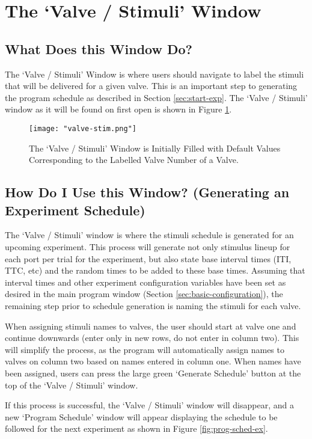 \documentclass{article}
\begin{document}
\clearpage
\section{The `Valve / Stimuli' Window}
\label{sec:valve-stim-window}
\subsection{What Does this Window Do?}
The `Valve / Stimuli' Window is where users should navigate to label the stimuli that will be delivered for a given valve. This is an important step to generating the program 
schedule as described in Section \ref{sec:start-exp}. The `Valve / Stimuli' window as it will be found on first open is shown in Figure \ref{fig:valve-stim}.

\begin{figure}[h!]
    \centering
    \texttt{[image: "valve-stim.png"]}
    \caption{The `Valve / Stimuli' Window is Initially Filled with Default Values Corresponding to the Labelled Valve Number of a Valve.}
    \label{fig:valve-stim}
\end{figure}
\FloatBarrier

\subsection{How Do I Use this Window? (Generating an Experiment Schedule)}
The `Valve / Stimuli' window is where the stimuli schedule is generated for an upcoming experiment. This process will generate not only stimulus lineup for each port 
per trial for the experiment, but also state base interval times (ITI, TTC, etc) and 
the random times to be added to these base times. Assuming that interval times and other experiment configuration variables have been set as desired in the main 
program window (Section \ref{sec:basic-configuration}), the remaining step prior to schedule generation is naming the stimuli for each valve. 

When assigning stimuli names to valves, the user should start at valve one and continue downwards (enter only in new rows, do not enter in column two). This will simplify
the process, as the program will automatically assign names to valves on column two based on names entered in column one. When names have been assigned, users can press the
large green `Generate Schedule' button at the top of the `Valve / Stimuli' window.

If this process is successful, the `Valve / Stimuli' window will disappear, and a new `Program Schedule' window will appear displaying the schedule to be followed for the 
next experiment as shown in Figure \ref{fig:prog-sched-ex}.
\end{document}

